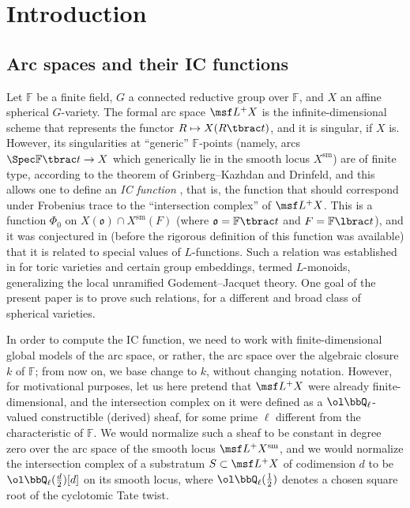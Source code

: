 \documentclass[final]{amsart}
\theoremstyle{remark}
\theoremstyle{definition}
\numberwithin{equation}{section}
\begin{document}
\tableofcontents 



\section{Introduction}



\subsection{Arc spaces and their IC functions}


Let $\mathbb F$ be a finite field, $G$ a connected reductive group over $\mathbb F$, and $X$ an affine spherical $G$-variety. The formal arc space $\msf L^+X$ is the infinite-dimensional scheme that represents the functor $R\mapsto X(R\tbrac t)$, and it is singular, if $X$ is. However, its singularities at ``generic'' $\mathbb F$-points (namely, arcs $\Spec \mathbb F\tbrac t \to X$ which generically lie in the smooth locus $X^{\text{sm}}$) are of finite type, according to the theorem of Grinberg--Kazhdan and Drinfeld, and this allows one to define an \emph{IC function} \cite{BNS}, that is, the function that should correspond under Frobenius trace to the ``intersection complex'' of $\msf L^+X$. This is a function $\Phi_0$ on $X(\mathfrak o)\cap X^{\text{sm}}(F)$ (where $\mathfrak o=\mathbb F\tbrac t$ and $F = \mathbb F\lbrac t$), and it was conjectured in \cite{SaRS} (before the rigorous definition of this function was available) that it is related to special values of $L$-functions. Such a relation was established in \cite{BNS} for toric varieties and certain group embeddings, termed $L$-monoids, generalizing the local unramified Godement--Jacquet theory. One goal of the present paper is to prove such relations, for a different and broad class of spherical varieties. 

In order to compute the IC function, we need to work with finite-dimensional global models of the arc space, or rather, the arc space over the algebraic closure $k$ of $\mathbb F$; from now on, we  base change to $k$,  without changing notation. However, for motivational purposes, let us here pretend that $\msf L^+X$ were already finite-dimensional, and the intersection complex on it were defined as a $\ol\bbQ_\ell$-valued constructible (derived) sheaf, for some prime $\ell$ different from the characteristic of $\mathbb F$. We would normalize such a sheaf to be constant in degree zero over the arc space of the smooth locus $\msf L^+X^{\text{sm}}$, and we would normalize the intersection complex of a substratum $S\subset \msf L^+X$ of codimension $d$ to be $\ol\bbQ_\ell(\frac{d}{2})[d]$ on its smooth locus, where $\ol\bbQ_\ell(\frac{1}{2})$ denotes a chosen square root of the cyclotomic Tate twist. 
\end{document}
